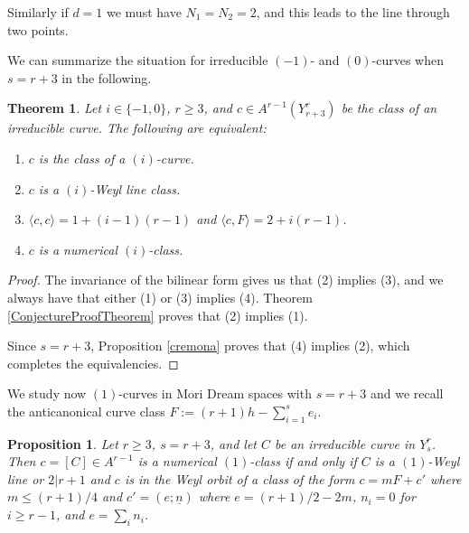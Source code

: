 \documentclass[12pt]{article}
\newtheorem{theorem}[equation]{Theorem}
\newtheorem{proposition}[equation]{Proposition}
\numberwithin{equation}{section}
\numberwithin{subeq}{equation}
\begin{document}
Similarly if $d=1$ we must have $N_1 = N_2 = 2$, and this leads to the line through two points.


We can summarize the situation for irreducible $(-1)$- and $(0)$-curves 
when $s = r+3$ in the following.

\begin{theorem}\label{class2} Let $i\in \{-1,0\}$, $r \geq 3$, 
and  $c\in A^{r-1}(Y^{r}_{r+3})$ be the class of an irreducible curve.  
The following are equivalent:
\begin{enumerate}
\item $c$ is the class of a $(i)$-curve.
\item $c$ is a $(i)$-Weyl line class.
\item $\langle c, c \rangle=1+(i-1)(r-1)$ and $\langle c, F \rangle =2+i(r-1)$.
\item $c$ is a numerical $(i)$-class.
\end{enumerate}
\end{theorem}

\begin{proof}%
The invariance of the bilinear form gives us that (2) implies (3),
and we always have that either (1) or (3) implies (4).
Theorem \ref{ConjectureProofTheorem} proves that (2) implies (1).

Since $s=r+3$, Proposition \ref{cremona} proves that (4) implies (2),
which completes the equivalencies.
\end{proof}

We study now $(1)$-curves in Mori Dream spaces with $s = r+3$
 and we recall the anticanonical curve class $F:=(r+1)h-\sum_{i=1}^{s}e_i$.

\begin{proposition}\label{icremona}
Let $r \geq 3$, $s=r+3$, and let $C$ be an irreducible curve in $Y^r_s$.
Then $c=[C]\in A^{r-1}$ is a numerical $(1)$-class if and only if
$C$ is a $(1)$-Weyl line
or $2|r+1$ and $c$ is in the Weyl orbit of a class of the form
$c = mF + c'$
where $m \leq (r+1)/4$ and $c' = (e;\underline{n})$
where $e=(r+1)/2 - 2m$, $n_i = 0$ for $i \geq r-1$, and $e = \sum_i n_i$.


\end{proposition}
\end{document}
